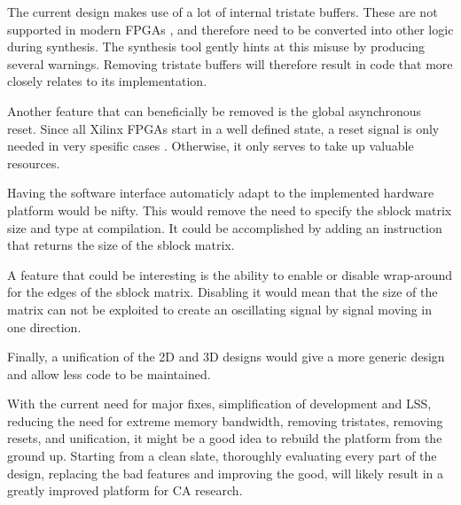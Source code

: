 The current design makes use of a lot of internal tristate buffers.
These are not supported in modern FPGAs \cite{koch2008buses}, and therefore need to be converted into other logic during synthesis.
The synthesis tool gently hints at this misuse by producing several warnings.
Removing tristate buffers will therefore result in code that more closely relates to its implementation.

Another feature that can beneficially be removed is the global asynchronous reset.
Since all Xilinx FPGAs start in a well defined state, a reset signal is only needed in very spesific cases \cite{ug687} \cite{wp272}.
Otherwise, it only serves to take up valuable resources.

Having the software interface automaticly adapt to the implemented hardware platform would be nifty.
This would remove the need to specify the sblock matrix size and type at compilation.
It could be accomplished by adding an instruction that returns the size of the sblock matrix.

A feature that could be interesting is the ability to enable or disable wrap-around for the edges of the sblock matrix.
Disabling it would mean that the size of the matrix can not be exploited to create an oscillating signal by signal moving in one direction.


Finally, a unification of the 2D and 3D designs would give a more generic design and allow less code to be maintained.

With the current need for major fixes, simplification of development and LSS, reducing the need for extreme memory bandwidth, removing tristates, removing resets, and unification, it might be a good idea to rebuild the platform from the ground up.
Starting from a clean slate, thoroughly evaluating every part of the design, replacing the bad features and improving the good, will likely result in a greatly improved platform for CA research.


